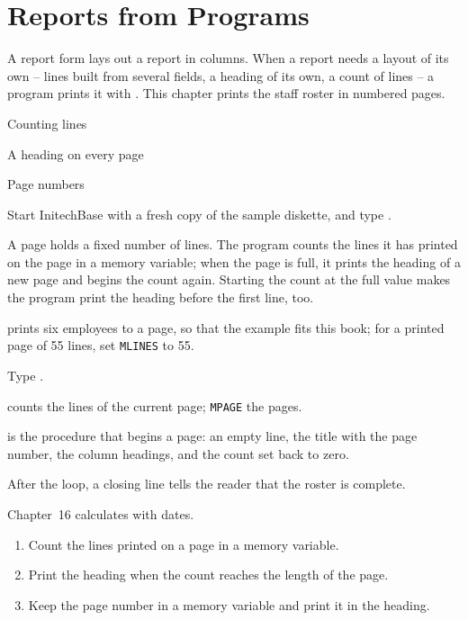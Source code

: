 \chapter{Reports from Programs}
A report form lays out a report in columns.  When a report needs a layout of
its own -- lines built from several fields, a heading of its own, a count of
lines -- a program prints it with .  This chapter prints the staff
roster in numbered pages.

\begin{ChapterCovers}
\item Counting lines
\item A heading on every page
\item Page numbers
\end{ChapterCovers}

Start InitechBase with a fresh copy of the sample diskette, and type
.

A page holds a fixed number of lines.  The program counts the lines it has
printed on the page in a memory variable; when the page is full, it prints the
heading of a new page and begins the count again.  Starting the count at the
full value makes the program print the heading before the first line, too.

 prints six employees to a page, so that the example fits this
book; for a printed page of 55 lines, set \texttt{MLINES} to 55.
\begin{Steps}
\item Type .
\end{Steps}
counts the lines of the current page; \texttt{MPAGE} the pages.

is the procedure that begins a page: an empty line, the title
with the page number, the column headings, and the count set back to zero.

After the loop, a closing line tells the reader that the
roster is complete.

Chapter~16 calculates with dates.

\begin{enumerate}
\item Count the lines printed on a page in a memory variable.
\item Print the heading when the count reaches the length of the page.
\item Keep the page number in a memory variable and print it in the heading.
\end{enumerate}
